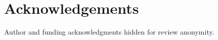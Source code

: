 \documentclass{sig-alternate}
\newcommand{\todo}[1]{\textcolor{cyan}{\textbf{[#1]}}}
\newif\ifisnopii
\begin{document}


\section*{Acknowledgements}

\ifisnopii %
\todo{put information in here}
\else %
Author and funding acknowledgments hidden for review anonymity.
\fi %


\balance





\end{document}
